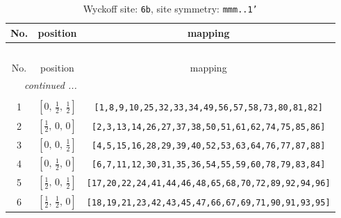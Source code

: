 \documentclass[fleqn,8pt]{jsarticle}
\begin{document}
\begin{longtable}{ccc}
\caption{Wyckoff site: {\tt 6b}, site symmetry: {\tt mmm..1'}}
 \\
 \hline \hline
No. & position & mapping \\ \hline \endfirsthead

\multicolumn{2}{l}{\tablename\ \thetable{}} \\
 \hline \hline
No. & position & mapping \\ \hline \endhead

 \hline \hline
\multicolumn{2}{r}{\footnotesize\it continued ...} \\ \endfoot

 \hline \hline
\multicolumn{2}{r}{} \\ \endlastfoot

1 & $\left[ 0,\, \frac{1}{2},\, \frac{1}{2} \right]$ & {\tt [1,8,9,10,25,32,33,34,49,56,57,58,73,80,81,82]} \\ \hline
2 & $\left[ \frac{1}{2},\, 0,\, 0 \right]$ & {\tt [2,3,13,14,26,27,37,38,50,51,61,62,74,75,85,86]} \\ \hline
3 & $\left[ 0,\, 0,\, \frac{1}{2} \right]$ & {\tt [4,5,15,16,28,29,39,40,52,53,63,64,76,77,87,88]} \\ \hline
4 & $\left[ 0,\, \frac{1}{2},\, 0 \right]$ & {\tt [6,7,11,12,30,31,35,36,54,55,59,60,78,79,83,84]} \\ \hline
5 & $\left[ \frac{1}{2},\, 0,\, \frac{1}{2} \right]$ & {\tt [17,20,22,24,41,44,46,48,65,68,70,72,89,92,94,96]} \\ \hline
6 & $\left[ \frac{1}{2},\, \frac{1}{2},\, 0 \right]$ & {\tt [18,19,21,23,42,43,45,47,66,67,69,71,90,91,93,95]} \\
\end{longtable}
\renewcommand{\arraystretch}{1.2}
\end{document}
